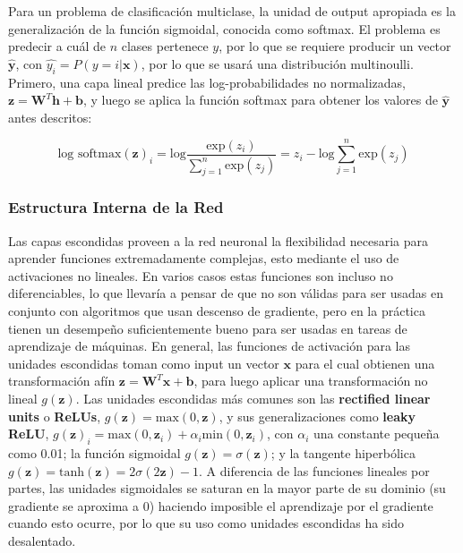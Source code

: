 Para un problema de clasificaci\'on multiclase, la unidad de output apropiada es la generalizaci\'on de la funci\'on sigmoidal, conocida como softmax. El problema es predecir a cu\'al de $n$ clases pertenece $y$, por lo que se requiere producir un vector $\hat{\bm{y}}$, con $\hat{y_{i}} = P(y=i|\bm{x})$, por lo que se usar\'a una distribuci\'on multinoulli. Primero, una capa lineal predice las log-probabilidades no normalizadas, $\bm{z} = \bm{W}^{T}\bm{h} + \bm{b}$, y luego se aplica la funci\'on softmax para obtener los valores de $\hat{\bm{y}}$ antes descritos:

\begin{equation}
\textrm{log softmax}(\bm{z})_{i} = \textrm{log}\frac{\textrm{exp}(z_{i})}{\sum_{j=1}^{n}\textrm{exp}({z_{j}})} = z_{i} - \textrm{log}\sum_{j=1}^{n}\textrm{exp}({z_{j}})
\end{equation}

\subsubsection{Estructura Interna de la Red}

Las capas escondidas proveen a la red neuronal la flexibilidad necesaria para aprender funciones extremadamente complejas, esto mediante el uso de activaciones no lineales. En varios casos estas funciones son incluso no diferenciables, lo que llevar\'ia a pensar de que no son v\'alidas para ser usadas en conjunto con algoritmos que usan descenso de gradiente, pero en la pr\'actica tienen un desempe\~{n}o suficientemente bueno para ser usadas en tareas de aprendizaje de m\'aquinas. En general, las funciones de activaci\'on para las unidades escondidas toman como input un vector $\bm{x}$ para el cual obtienen una transformaci\'on af\'in $\bm{z} = \bm{W}^{T}\bm{x} + \bm{b}$, para luego aplicar una transformaci\'on no lineal $g(\bm{z})$. Las unidades escondidas m\'as comunes son las \textbf{rectified linear units} o \textbf{ReLUs}, $g(\bm{z}) = \textrm{max}(0, \bm{z})$, y sus generalizaciones como \textbf{leaky ReLU}, $g(\bm{z})_{i} = \textrm{max}(0, \bm{z}_{i}) + \alpha_{i}\textrm{min}(0, \bm{z}_{i})$, con $\alpha_{i}$ una constante peque\~{n}a como 0.01; la funci\'on sigmoidal $g(\bm{z}) = \sigma(\bm{z})$; y la tangente hiperb\'olica $g(\bm{z}) =  \textrm{tanh}(\bm{z}) = 2\sigma(2\bm{z}) - 1$. A diferencia de las funciones lineales por partes, las unidades sigmoidales se saturan en la mayor parte de su dominio (su gradiente se aproxima a 0) haciendo imposible el aprendizaje por el gradiente cuando esto ocurre, por lo que su uso como unidades escondidas ha sido desalentado.

